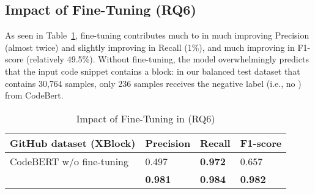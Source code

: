 \subsection{Impact of Fine-Tuning (RQ6)}
\label{sec:rq6}



As seen in Table~\ref{tab:codebert}, fine-tuning contributes much to
{\tool} in much improving Precision (almost twice) and slightly
improving in Recall (1\%), and much improving in F1-score (relatively
49.5\%). Without fine-tuning, the model 
overwhelmingly predicts that the input code snippet contains a
 block: in our balanced test dataset that contains
30,764 samples, only 236 samples receives the negative label (i.e., no
) from CodeBert.



\begin{table}[t]%
  \caption{Impact of Fine-Tuning in {\tool} (RQ6)}
  \vspace{-12pt}
  \small
	\begin{center}
		\renewcommand{\arraystretch}{1}
		\begin{tabular}{| p{3.15cm}<{\centering} | p{1.2cm}<{\centering} | p{1.2cm}<{\centering}| p{1.2cm}<{\centering}|}
		  \hline
			GitHub dataset (XBlock)  & Precision  &  Recall & F1-score \\
			\hline
			CodeBERT w/o fine-tuning & 0.497  & \textbf{0.972}   & 0.657\\
			\hline
			\tool   &  \textbf{0.981} &  {\bf 0.984} & \textbf{0.982}\\
			\hline
		\end{tabular}
		\label{tab:codebert}
	\end{center}
\end{table}
